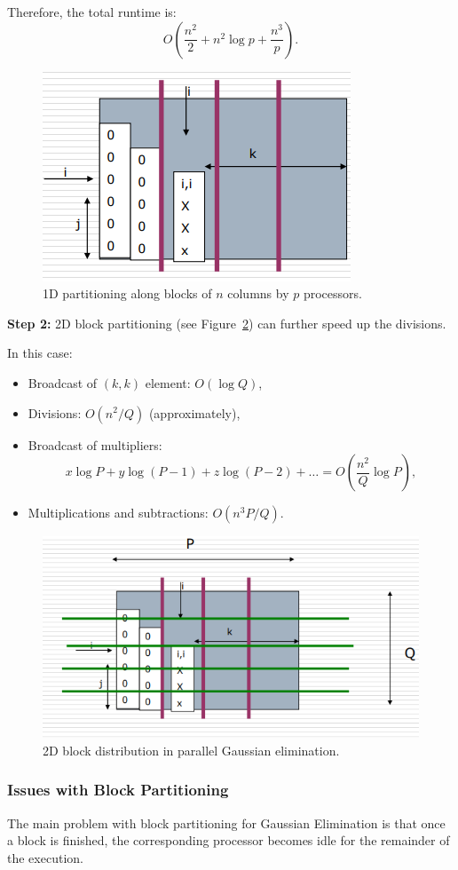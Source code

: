 \documentclass[12pt]{book}
\begin{document}
Therefore, the total runtime is:
\[
O\!\left(\frac{n^2}{2} + n^2 \log p + \frac{n^3}{p}\right).
\]

\begin{figure}[H]
    \centering
    \includegraphics[width=0.5\linewidth]{images/1dBlockGE.png}
    \caption{1D partitioning along blocks of $n$ columns by $p$ processors.}
    \label{fig:1DblockGE}
\end{figure}

\textbf{Step 2:} 2D block partitioning (see Figure~\ref{fig:2dblockGE}) can further speed up the divisions.  

In this case:
\begin{itemize}
    \item Broadcast of $(k,k)$ element: $O(\log Q)$,
    \item Divisions: $O(n^2/Q)$ (approximately),
    \item Broadcast of multipliers: 
    \[
        x \log P + y \log (P-1) + z \log (P-2) + \ldots = O\!\left(\frac{n^2}{Q}\log P\right),
    \]
    \item Multiplications and subtractions: $O(n^3 P/Q)$.
\end{itemize}

\begin{figure}[H]
    \centering
    \includegraphics[width=0.5\linewidth]{images/2Dblockdistr.png}
    \caption{2D block distribution in parallel Gaussian elimination.}
    \label{fig:2dblockGE}
\end{figure}

\subsubsection{Issues with Block Partitioning}
The main problem with block partitioning for Gaussian Elimination is that once a block is finished, the corresponding processor becomes idle for the remainder of the execution.  
\end{document}
